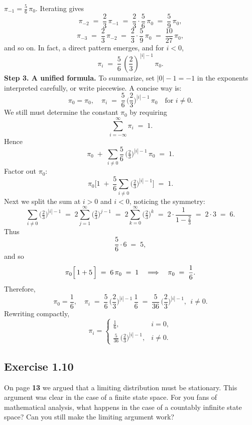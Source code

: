 \documentclass{article}
\begin{document}
{$\pi_{-1} = \tfrac{5}{6}\,\pi_0$. Iterating gives
\[
\pi_{-2} 
\;=\; 
\frac{2}{3}\,\pi_{-1}
\;=\;
\frac{2}{3} \cdot \frac{5}{6}\,\pi_0 
\;=\; 
\frac{5}{9}\,\pi_0,
\]
\[
\pi_{-3} 
\;=\; 
\frac{2}{3}\,\pi_{-2}
\;=\; 
\frac{2}{3}\cdot \frac{5}{9}\,\pi_0 
\;=\; 
\frac{10}{27}\,\pi_0,
\]
and so on. In fact, a direct pattern emerges, and for $i<0$,
\[
\pi_i 
\;=\;
\frac{5}{6}\,\left(\frac{2}{3}\right)^{\,|i|-1}\,\pi_0.
\]
\medskip
\textbf{Step 3. A unified formula.}
To summarize, set $|0|-1 = -1$ in the exponents interpreted carefully, or write piecewise.  A concise way is:
\[
\pi_0 = \pi_0,
\quad
\pi_i 
\;=\;
\frac{5}{6} \,\biggl(\frac{2}{3}\biggr)^{|i|-1}\,\pi_0 
\quad
\text{for } i \neq 0.
\]
We still must determine the constant $\pi_0$ by requiring
\[
\sum_{i=-\infty}^{\infty} \pi_i \;=\; 1.
\]
Hence
\[
\pi_0 
\;+\;
\sum_{i\neq 0} \frac{5}{6} \,\biggl(\tfrac{2}{3}\biggr)^{|i|-1}\,\pi_0
\;=\; 1.
\]
Factor out $\pi_0$:
\[
\pi_0 
\biggl[
1 
\;+\; 
\frac{5}{6}\sum_{i\neq 0}\bigl(\tfrac{2}{3}\bigr)^{|i|-1}
\biggr]
\;=\; 1.
\]
Next we split the sum at $i>0$ and $i<0$, noticing the symmetry:
\[
\sum_{i\neq 0}\bigl(\tfrac{2}{3}\bigr)^{|i|-1} 
\;=\;
2 \sum_{j=1}^{\infty} \bigl(\tfrac{2}{3}\bigr)^{j-1}
\;=\;
2 \sum_{k=0}^{\infty} \bigl(\tfrac{2}{3}\bigr)^{k}
\;=\;
2 \cdot \frac{1}{1 - \tfrac{2}{3}}
\;=\;
2 \cdot 3
\;=\;
6.
\]
Thus
\[
\frac{5}{6} \cdot 6
\;=\;
5,
\]
and so
\[
\pi_0 \Bigl[\,1 + 5\,\Bigr] 
\;=\;
6\,\pi_0
\;=\;
1 
\quad\Longrightarrow\quad
\pi_0 
\;=\; 
\frac{1}{6}.
\]
Therefore,
\[
\pi_0 = \frac{1}{6},
\quad
\pi_i 
\;=\;
\frac{5}{6}\,\biggl(\frac{2}{3}\biggr)^{|i|-1}\,\frac{1}{6}
\;=\;
\frac{5}{36}\,\biggl(\frac{2}{3}\biggr)^{|i|-1},
\ \ i \neq 0.
\]
Rewriting compactly,
\[
\pi_i
=
\begin{cases}
\displaystyle \frac{1}{6}, 
& i=0,\\[6pt]
\displaystyle \frac{5}{36}\,\bigl(\tfrac{2}{3}\bigr)^{|i|-1},
& i \neq 0.
\end{cases}
\]
}


\subsection*{Exercise 1.10} On page \textbf{13} we argued that a limiting distribution must be stationary. This argument was clear in the case of a finite state space. For you fans of mathematical analysis, what happens in the case of a countably infinite state space? Can you still make the limiting argument work?
\end{document}

